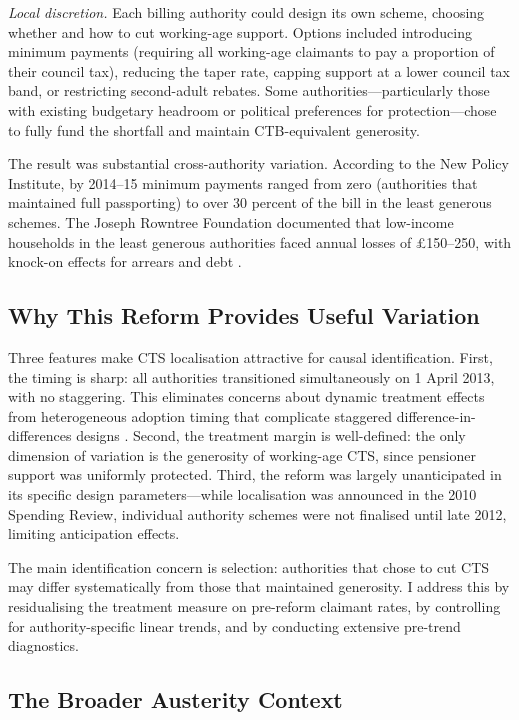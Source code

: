 \documentclass[12pt]{article}
\begin{document}
\emph{Local discretion.} Each billing authority could design its own scheme, choosing whether and how to cut working-age support. Options included introducing minimum payments (requiring all working-age claimants to pay a proportion of their council tax), reducing the taper rate, capping support at a lower council tax band, or restricting second-adult rebates. Some authorities---particularly those with existing budgetary headroom or political preferences for protection---chose to fully fund the shortfall and maintain CTB-equivalent generosity.

The result was substantial cross-authority variation. According to the New Policy Institute, by 2014--15 minimum payments ranged from zero (authorities that maintained full passporting) to over 30 percent of the bill in the least generous schemes. The Joseph Rowntree Foundation documented that low-income households in the least generous authorities faced annual losses of \pounds 150--250, with knock-on effects for arrears and debt \citep{jrf2015council}.

\subsection{Why This Reform Provides Useful Variation}

Three features make CTS localisation attractive for causal identification. First, the timing is sharp: all authorities transitioned simultaneously on 1 April 2013, with no staggering. This eliminates concerns about dynamic treatment effects from heterogeneous adoption timing that complicate staggered difference-in-differences designs \citep{callaway2021difference, sun2021estimating}. Second, the treatment margin is well-defined: the only dimension of variation is the generosity of working-age CTS, since pensioner support was uniformly protected. Third, the reform was largely unanticipated in its specific design parameters---while localisation was announced in the 2010 Spending Review, individual authority schemes were not finalised until late 2012, limiting anticipation effects.

The main identification concern is selection: authorities that chose to cut CTS may differ systematically from those that maintained generosity. I address this by residualising the treatment measure on pre-reform claimant rates, by controlling for authority-specific linear trends, and by conducting extensive pre-trend diagnostics.

\subsection{The Broader Austerity Context}
\end{document}

